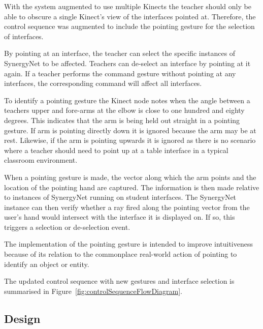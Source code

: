 \documentclass[link]{IWCOMP}
\begin{document}
With the system augmented to use multiple Kinects the teacher should only be able to obscure a single Kinect's view of the interfaces pointed at.
Therefore, the control sequence was augmented to include the pointing gesture for the selection of interfaces.

By pointing at an interface, the teacher can select the specific instances of SynergyNet to be affected.
Teachers can de-select an interface by pointing at it again.
If a teacher performs the command gesture without pointing at any interfaces, the corresponding command will affect all interfaces.

To identify a pointing gesture the Kinect node notes when the angle between a teachers upper and fore-arms at the elbow is close to one hundred and eighty degrees.
This indicates that the arm is being held out straight in a pointing gesture.
If arm is pointing directly down it is ignored because the arm may be at rest.
Likewise, if the arm is pointing upwards it is ignored as there is no scenario where a teacher should need to point up at a table interface in a typical classroom environment.

When a pointing gesture is made, the vector along which the arm points and the location of the pointing hand are captured.
The information is then made relative to instances of SynergyNet running on student interfaces.
The SynergyNet instance can then verify whether a ray fired along the pointing vector from the user's hand would intersect with the interface it is displayed on.
If so, this triggers a selection or de-selection event.

The implementation of the pointing gesture is intended to improve intuitiveness because of its relation to the commonplace real-world action of pointing to identify an object or entity.

The updated control sequence with new gestures and interface selection is summarised in Figure~\ref{fig:controlSequenceFlowDiagram}.

\subsection{Design}
\label{subsec:studyDesign}
\end{document}
